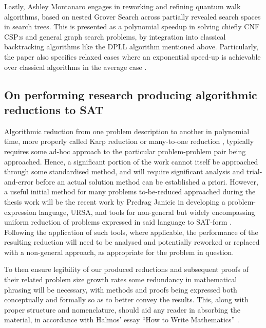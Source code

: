 \documentclass[msc,lith,english]{liuthesis}
\begin{document}

Lastly, Ashley Montanaro engages in reworking and refining quantum walk algorithms, based on nested Grover Search across partially revealed search spaces in search trees. This is presented as a polynomial speedup in solving chiefly CNF CSP:s and general graph search problems, by integration into classical backtracking algorithms like the DPLL algorithm mentioned above. Particularly, the paper also specifies relaxed cases where an exponential speed-up is achievable over classical algorithms in the average case \cite{QWSBA}.

\subsection{On performing research producing algorithmic reductions to SAT}

Algorithmic reduction from one problem description to another in polynomial time, more properly called Karp reduction or many-to-one reduction \cite{CCAMA}, typically requires some ad-hoc approach to the particular problem-problem pair being approached. Hence, a significant portion of the work cannot itself be approached through some standardised method, and will require significant analysis and trial-and-error before an actual solution method can be established a priori. However, a useful initial method for many problems to-be-reduced approached during the thesis work will be the recent work by Predrag Janicic in developing a problem-expression language, URSA, and tools for non-general but widely encompassing uniform reduction of problems expressed in said language to SAT-form \cite{URSA}. Following the application of such tools, where applicable, the performance of the resulting reduction will need to be analysed and potentially reworked or replaced with a non-general approach, as appropriate for the problem in question. 

To then ensure legibility of our produced reductions and subsequent proofs of their related problem size growth rates some redundancy in mathematical phrasing will be necessary, with methods and proofs being expressed both conceptually and formally so as to better convey the results. This, along with proper structure and nomenclature, should aid any reader in absorbing the material, in accordance with Halmos' essay ``How to Write Mathematics'' \cite{HTWM}.
\end{document}

